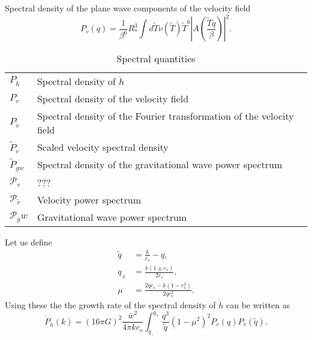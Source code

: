 Spectral density of the plane wave components of the velocity field \cite[eq. 4.17]{hindmarsh_gw_pt_2019}
\begin{equation}
P_v(q) = \frac{1}{\beta^6}{R_*^3} \int d\tilde{T} \nu(\tilde{T}) \tilde{T}^6 |A(\frac{\tilde{T}q}{\beta})|^2.
\label{eq:spec_den_v}
\end{equation}


\begin{table}
\caption{Spectral quantities}
\begin{tabular}{l|l}
$P_{\dot{h}}$ & Spectral density of $\dot{h}$ \\
$P_v$ & Spectral density of the velocity field \\
$P_{\tilde{v}}$ & Spectral density of the Fourier transformation of the velocity field \\
$\tilde{P}_v$ & Scaled velocity spectral density \\
$\tilde{P}_{gw}$ & Spectral density of the gravitational wave power spectrum \\
$\mathcal{P}_v$ & ??? \\
$\mathcal{P}_{\tilde{v}}$ & Velocity power spectrum \\
$\mathcal{P}_gw$ & Gravitational wave power spectrum
\end{tabular}
\label{table:symbols}
\end{table}

Let us define
\begin{align}
\tilde{q} &= \frac{k}{c_s} - q, \\
q_\pm &= \frac{k(1 \pm c_s)}{2 c_s}, \\
\mu &= \frac{2qc_s - k(1 - c_s^2)}{2qc_s^2}.
\end{align}
Using these the the growth rate of the spectral density of $\dot{h}$ can be written as
\begin{equation}
\dot{P}_{\dot{h}} (k) = (16 \pi G)^2 \frac{\bar{w}^2}{4 \pi k c_s} \int_{q_-}^{q_+} \frac{q^3}{\tilde{q}} (1 - \mu^2)^2 P_v(q) P_v(\tilde{q}).
\end{equation}

